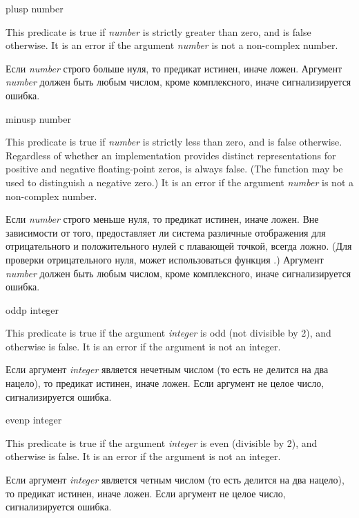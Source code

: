 \begin{defun}[Function]
plusp number

This predicate is true if \emph{number} is strictly greater than zero,
and is false otherwise.
It is an error if the argument \emph{number} is not a non-complex number.

Если \emph{number} строго больше нуля, то предикат истинен, иначе ложен.
Аргумент \emph{number} должен быть любым числом, кроме комплексного, иначе
сигнализируется ошибка. 
\end{defun}

\begin{defun}[Function]
minusp number

This predicate is true if \emph{number} is strictly less than zero,
and is false otherwise.
Regardless of whether an implementation provides distinct representations
for positive and negative floating-point zeros,
 is always false.
(The function  may be used to distinguish a negative zero.)
It is an error if the argument \emph{number} is not a non-complex number.

Если \emph{number} строго меньше нуля, то предикат истинен, иначе ложен.
Вне зависимости от того, предоставляет ли система различные отображения для
отрицательного и положительного нулей с плавающей точкой, 
всегда ложно.
(Для проверки отрицательного нуля, может использоваться функция
.)
Аргумент \emph{number} должен быть любым числом, кроме комплексного, иначе
сигнализируется ошибка. 
\end{defun}

\begin{defun}[Function]
oddp integer

This predicate is true if the argument \emph{integer} is odd (not divisible
by 2), and otherwise is false.  It is an error if the argument is not
an integer.

Если аргумент \emph{integer} является нечетным числом (то есть не делится на два
нацело), то предикат истинен, иначе ложен.
Если аргумент не целое число, сигнализируется ошибка.
\end{defun}

\begin{defun}[Function]
evenp integer

This predicate is true if the argument \emph{integer} is even (divisible
by 2), and otherwise is false.  It is an error if the argument is not
an integer.

Если аргумент \emph{integer} является четным числом (то есть делится на два
нацело), то предикат истинен, иначе ложен.
Если аргумент не целое число, сигнализируется ошибка.
\end{defun}


